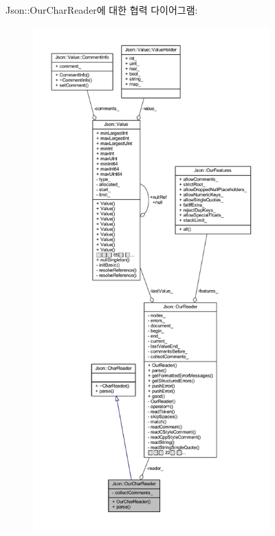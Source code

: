 Json\+:\+:Our\+Char\+Reader에 대한 협력 다이어그램\+:
\nopagebreak
\begin{figure}[H]
\begin{center}
\leavevmode
\includegraphics[height=550pt]{class_json_1_1_our_char_reader__coll__graph}
\end{center}
\end{figure}
